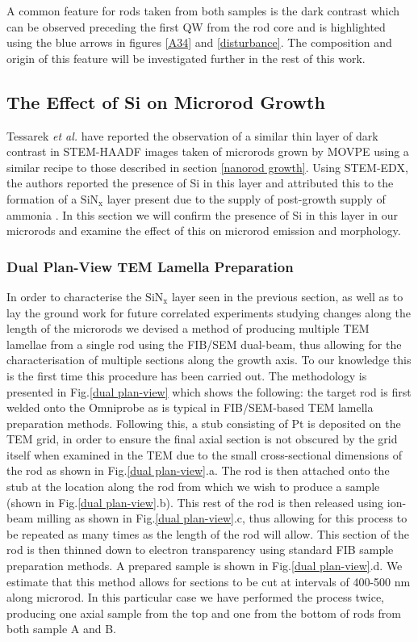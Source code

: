 \FloatBarrier

A common feature for rods taken from both samples is the dark contrast which can be observed preceding the first QW from the rod core and is highlighted using the blue arrows in figures \ref{A34} and \ref{disturbance}. The composition and origin of this feature will be investigated further in the rest of this work. 


\subsection{The Effect of Si on Microrod Growth}

Tessarek \textit{et al.} have reported the observation of a similar thin layer of dark contrast in STEM-HAADF images taken of microrods grown by MOVPE using a similar recipe to those described in section \ref{nanorod growth}. Using STEM-EDX, the authors reported the presence of Si in this layer and attributed this to the formation of a $\mathrm{SiN_{x}}$ layer present due to the supply of post-growth supply of ammonia \cite{Tessarek2014a}. In this section we will confirm the presence of Si in this layer in our microrods and examine the effect of this on microrod emission and morphology.


\subsubsection{Dual Plan-View TEM Lamella Preparation}

In order to characterise the $\mathrm{SiN_{x}}$ layer seen in the previous section, as well as to lay the ground work for future correlated experiments studying changes along the length of the microrods we devised a method of producing multiple TEM lamellae from a single rod using the FIB/SEM dual-beam, thus allowing for the characterisation of multiple sections along the growth axis. To our knowledge this is the first time this procedure has been carried out.
The methodology is presented in Fig.\ref{dual plan-view} which shows the following: the target rod is first welded onto the Omniprobe as is typical in FIB/SEM-based TEM lamella preparation methods. Following this, a stub consisting of Pt is deposited on the TEM grid, in order to ensure the final axial section is not obscured by the grid itself when examined in the TEM due to the small cross-sectional dimensions of the rod as shown in Fig.\ref{dual plan-view}.a. The rod is then attached onto the stub at the location along the rod from which we wish to produce a sample (shown in Fig.\ref{dual plan-view}.b). This rest of the rod is then released using ion-beam milling as shown in Fig.\ref{dual plan-view}.c, thus allowing for this process to be repeated as many times as the length of the rod will allow. This section of the rod is then thinned down to electron transparency using standard FIB sample preparation methods. A prepared sample is shown in Fig.\ref{dual plan-view}.d. We estimate that this method allows for sections to be cut at intervals of 400-500 nm along microrod. In this particular case we have performed the process twice, producing one axial sample from the top and one from the bottom of rods from both sample A and B.

